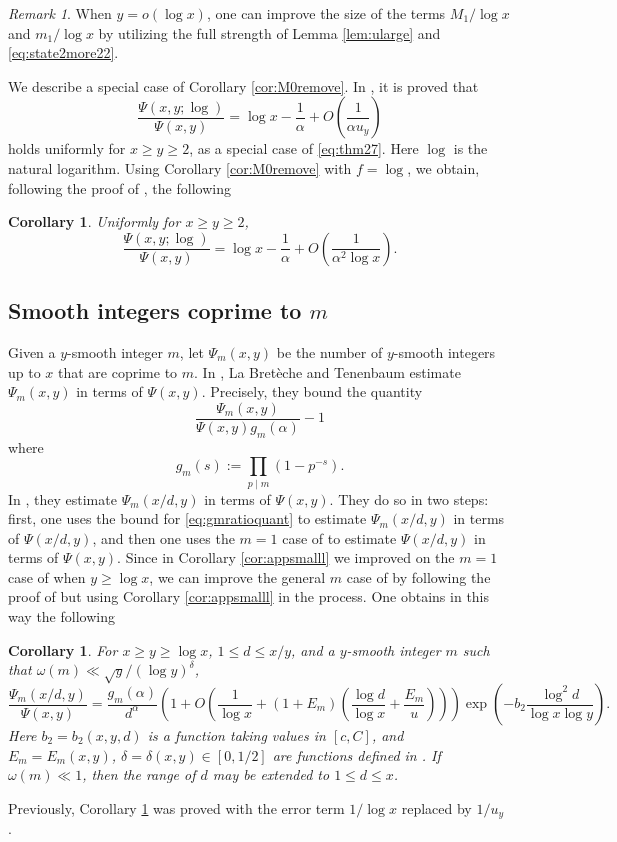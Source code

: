 \documentclass{amsart}
\theoremstyle{plain}
\newtheorem{cor}[thm]{Corollary}
\theoremstyle{remark}
\newtheorem{rem}{Remark}
\begin{document}
\begin{rem} 
When $y=o(\log x)$, one can improve the size of the terms $M_1/\log x$ and $m_1/\log x$ by utilizing the full strength of Lemma \ref{lem:ularge} and \eqref{eq:state2more22}. 
\end{rem}
We describe a special case of Corollary \ref{cor:M0remove}. In \cite[Cor.~2.8]{DLBT20052}, it is proved that 
\[	\frac{\Psi(x,y;\log)}{\Psi(x,y)} = \log x-\frac{1}{\alpha}+O\left( \frac{1}{\alpha u_y}\right) \]
holds uniformly for $x \ge y \ge 2$, as a special case of \eqref{eq:thm27}. Here $\log$ is the natural logarithm. Using Corollary \ref{cor:M0remove} with $f=\log$, we obtain, following the proof of \cite[Cor.~2.8]{DLBT20052}, the following
\begin{cor}\label{cor:log}
	Uniformly for $x \ge y \ge 2$,
	\[ \frac{\Psi(x,y;\log)}{\Psi(x,y)} = \log x-\frac{1}{\alpha}+O\left( \frac{1}{\alpha^2 \log x}\right).\]
\end{cor}
\subsection{Smooth integers coprime to \texorpdfstring{$m$}{m}}
Given a $y$-smooth integer $m$, let $\Psi_m(x,y)$ be the number of $y$-smooth integers up to $x$ that are coprime to $m$. In \cite[Thm.~2.1]{DLBT20052}, La Bret\`eche and Tenenbaum estimate $\Psi_m(x,y)$ in terms of $\Psi(x,y)$. Precisely, they bound the quantity
\begin{equation}\label{eq:gmratioquant} \frac{\Psi_m(x,y)}{\Psi(x,y)g_m(\alpha)} - 1
\end{equation}
where
\[g_m(s):=\prod_{p \mid m}(1-p^{-s}).\]
In \cite[Thm.~2.4]{DLBT20052}, they estimate $\Psi_m(x/d,y)$ in terms of $\Psi(x,y)$. They do so in two steps: first, one uses the bound for \eqref{eq:gmratioquant} to estimate $\Psi_m(x/d,y)$ in terms of $\Psi(x/d,y)$, and then  one uses the $m=1$ case of \cite[Thm.~2.4]{DLBT20052} to estimate $\Psi(x/d,y)$ in terms of $\Psi(x,y)$. Since in Corollary \ref{cor:appsmalll} we improved on the $m=1$ case of \cite[Thm.~2.4]{DLBT20052} when $y \ge \log x$, we can improve the general $m$ case of \cite[Thm.~2.4]{DLBT20052} by following the proof of \cite[Thm.~2.4]{DLBT20052} but using Corollary \ref{cor:appsmalll} in the process. One obtains in this way the following
\begin{cor}\label{cor:cop}
	For $x \ge y \ge \log x$, $1 \le d \le x/y$, and a $y$-smooth integer $m$ such that $\omega(m) \ll \sqrt{y}/(\log y)^{\delta}$,
\[	\frac{\Psi_m(x/d,y)}{\Psi(x,y)} =  \frac{g_m(\alpha)}{d^{\alpha}}\left( 1+O\left(\frac{1}{\log x}+(1+E_m)\left( \frac{\log d}{\log x} + \frac{E_m}{u}\right)\right)\right)\exp\left(-b_2 \frac{\log^2 d}{\log x \log y} \right).\]
Here $b_2=b_2(x,y,d)$ is a function taking values in $[c,C]$, and $E_m=E_m(x,y)$, $\delta=\delta(x,y)\in [0,1/2]$ are functions defined in \cite[Eqs.~(2.5) and (2.8)]{DLBT20052}.
 If $\omega(m) \ll 1$, then the range of $d$ may be extended to $1 \le d \le x$.
\end{cor}
Previously, Corollary \ref{cor:cop}  was proved with the error term $1/\log x$ replaced by $1/u_y$ \cite[Thm.~2.4]{DLBT20052}.
\end{document}
